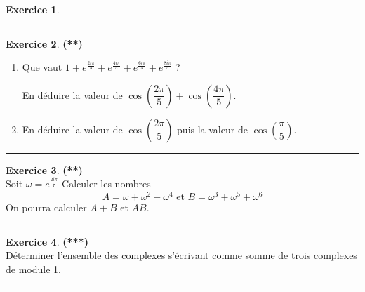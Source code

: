 \documentclass[a4paper,11pt]{article}
\theoremstyle{definition}
\newtheorem{exo}{Exercice} %
\begin{document}
\begin{minipage}{1\linewidth}
\begin{minipage}[c]{0.48\linewidth}
\begin{exo}
			\centering
			\rule{1\linewidth}{0.6pt}
		\end{exo}
		
	\end{minipage}	
	\hfill\vrule\hfill
	\begin{minipage}[c]{0.48\linewidth}
		\raggedright
		
		\begin{exo}\textbf{(**)}\quad\\[0.2cm]%
			\begin{enumerate}
				\item Que vaut $1+e^{\frac{2i\pi}{5}}+e^{\frac{4i\pi}{5}}+e^{\frac{6i\pi}{5}}+e^{\frac{8i\pi}{5}}$ ? 
				
				En déduire la valeur de $\cos\left( \dfrac{2\pi}{5} \right)+\cos\left( \dfrac{4\pi}{5} \right)$.
				\item En déduire la valeur de $\cos\left( \dfrac{2\pi}{5} \right)$ puis la valeur de $\cos\left( \dfrac{\pi}{5} \right)$. 
			\end{enumerate}
			\centering
			\rule{1\linewidth}{0.6pt}
		\end{exo}
		

		
		\begin{exo}\textbf{(**)}\quad\\[0.2cm]
			Soit $\omega = e^{\frac{2i\pi}{7}}$
			Calculer les nombres
			$$ A = \omega + \omega^2 + \omega^4 \text{ et } B = \omega^3 + \omega^5 + \omega^6$$
			On pourra calculer $A+B$ et $AB$.
			
			\centering
			\rule{1\linewidth}{0.6pt}
		\end{exo}
		

		\begin{exo}\textbf{(***)}\quad\\[0.2cm]
		Déterminer l'ensemble des complexes s’écrivant comme somme de trois complexes de module 1.
		
		\centering
		\rule{1\linewidth}{0.6pt}
	\end{exo}
	
		
		
	\end{minipage}
\end{minipage}
\end{document}
